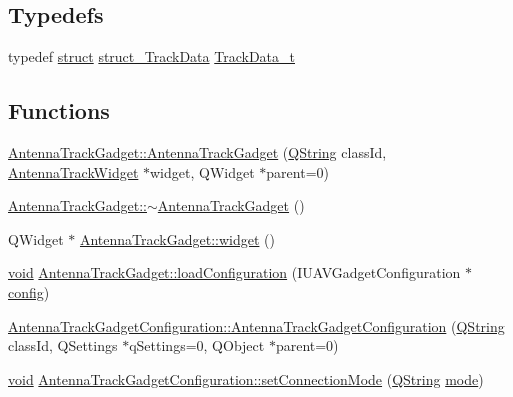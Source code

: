 \subsection*{Typedefs}
\begin{DoxyCompactItemize}
\item 
typedef \hyperlink{sdlgamepad_8dox_aba655c5729da86df745f0c8e7f9ba8d2}{struct} \hyperlink{structstruct___track_data}{struct\-\_\-\-Track\-Data} \hyperlink{group___antenna_track_gadget_plugin_ga2a189738d52fd5df21e4a823d19ad1ac}{Track\-Data\-\_\-t}
\end{DoxyCompactItemize}
\subsection*{Functions}
\begin{DoxyCompactItemize}
\item 
\hyperlink{group___antenna_track_gadget_plugin_gafa295298db3662b9107fa1506ab434f7}{Antenna\-Track\-Gadget\-::\-Antenna\-Track\-Gadget} (\hyperlink{group___u_a_v_objects_plugin_gab9d252f49c333c94a72f97ce3105a32d}{Q\-String} class\-Id, \hyperlink{class_antenna_track_widget}{Antenna\-Track\-Widget} $\ast$widget, Q\-Widget $\ast$parent=0)
\item 
\hyperlink{group___antenna_track_gadget_plugin_ga90012834df22b16c7824162b33eae46d}{Antenna\-Track\-Gadget\-::$\sim$\-Antenna\-Track\-Gadget} ()
\item 
Q\-Widget $\ast$ \hyperlink{group___antenna_track_gadget_plugin_ga890a1b4ef09527df4e205d76d2378da1}{Antenna\-Track\-Gadget\-::widget} ()
\item 
\hyperlink{group___u_a_v_objects_plugin_ga444cf2ff3f0ecbe028adce838d373f5c}{void} \hyperlink{group___antenna_track_gadget_plugin_ga05e5ae93f50d470a38cd699e5662fcbf}{Antenna\-Track\-Gadget\-::load\-Configuration} (I\-U\-A\-V\-Gadget\-Configuration $\ast$\hyperlink{deflate_8c_a4473b5227787415097004fd39f55185e}{config})
\item 
\hyperlink{group___antenna_track_gadget_plugin_gaab0b8cb9542f69d06b53e54d5bb4761a}{Antenna\-Track\-Gadget\-Configuration\-::\-Antenna\-Track\-Gadget\-Configuration} (\hyperlink{group___u_a_v_objects_plugin_gab9d252f49c333c94a72f97ce3105a32d}{Q\-String} class\-Id, Q\-Settings $\ast$q\-Settings=0, Q\-Object $\ast$parent=0)
\item 
\hyperlink{group___u_a_v_objects_plugin_ga444cf2ff3f0ecbe028adce838d373f5c}{void} \hyperlink{group___antenna_track_gadget_plugin_gaa8c80d59aa822d7e1a73288f8da1447d}{Antenna\-Track\-Gadget\-Configuration\-::set\-Connection\-Mode} (\hyperlink{group___u_a_v_objects_plugin_gab9d252f49c333c94a72f97ce3105a32d}{Q\-String} \hyperlink{glext_8h_a1e71d9c196e4683cc06c4b54d53f7ef5}{mode})

\end{DoxyCompactItemize}
